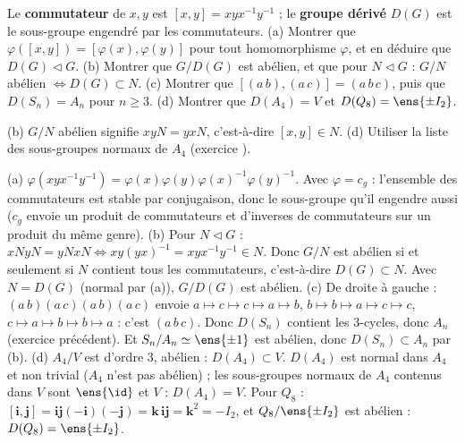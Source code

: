\begin{exo}
Le \textbf{commutateur} de $x,y$ est $[x,y]=xyx^{-1}y^{-1}$ ; le \textbf{groupe dérivé} $D(G)$ est le sous-groupe engendré par les commutateurs. (a) Montrer que $\varphi([x,y])=[\varphi(x),\varphi(y)]$ pour tout homomorphisme $\varphi$, et en déduire que $D(G)\lhd G$. (b) Montrer que $G/D(G)$ est abélien, et que pour $N\lhd G$ : $G/N$ abélien $\iff D(G)\subset N$. (c) Montrer que $[(a\,b),(a\,c)]=(a\,b\,c)$, puis que $D(S_n)=A_n$ pour $n\ge3$. (d) Montrer que $D(A_4)=V$ et $D(Q_8)=\ens{\pm I_2}$.
\begin{indication}
(b) $G/N$ abélien signifie $xyN=yxN$, c'est-à-dire $[x,y]\in N$. (d) Utiliser la liste des sous-groupes normaux de $A_4$ (exercice ).
\end{indication}
\begin{corrige}
(a) $\varphi(xyx^{-1}y^{-1})=\varphi(x)\varphi(y)\varphi(x)^{-1}\varphi(y)^{-1}$. Avec $\varphi=c_g$ : l'ensemble des commutateurs est stable par conjugaison, donc le sous-groupe qu'il engendre aussi ($c_g$ envoie un produit de commutateurs et d'inverses de commutateurs sur un produit du même genre).
(b) Pour $N\lhd G$ : $xNyN=yNxN\iff xy(yx)^{-1}=xyx^{-1}y^{-1}\in N$. Donc $G/N$ est abélien si et seulement si $N$ contient tous les commutateurs, c'est-à-dire $D(G)\subset N$. Avec $N=D(G)$ (normal par (a)), $G/D(G)$ est abélien.
(c) De droite à gauche : $(a\,b)(a\,c)(a\,b)(a\,c)$ envoie $a\mapsto c\mapsto c\mapsto a\mapsto b$, $b\mapsto b\mapsto a\mapsto c\mapsto c$, $c\mapsto a\mapsto b\mapsto b\mapsto a$ : c'est $(a\,b\,c)$. Donc $D(S_n)$ contient les 3-cycles, donc $A_n$ (exercice précédent). Et $S_n/A_n\simeq\ens{\pm1}$ est abélien, donc $D(S_n)\subset A_n$ par (b).
(d) $A_4/V$ est d'ordre 3, abélien : $D(A_4)\subset V$. $D(A_4)$ est normal dans $A_4$ et non trivial ($A_4$ n'est pas abélien) ; les sous-groupes normaux de $A_4$ contenus dans $V$ sont $\ens{\id}$ et $V$ : $D(A_4)=V$. Pour $Q_8$ : $[\mathbf i,\mathbf j]=\mathbf i\mathbf j(-\mathbf i)(-\mathbf j)=\mathbf k\,\mathbf i\mathbf j=\mathbf k^2=-I_2$, et $Q_8/\ens{\pm I_2}$ est abélien : $D(Q_8)=\ens{\pm I_2}$.
\end{corrige}
\end{exo}

